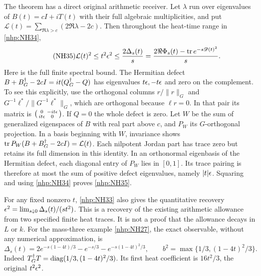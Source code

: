 The theorem has a direct original arithmetic receiver.
Let \(\lambda\) run over eigenvalues of \(B(t)=cI+iT(t)\)
with their full algebraic multiplicities, and put
\(\mathcal L(t)=\sum_{\Re\lambda>c}(2\Re\lambda-2c)\).
Then throughout the heat-time range in \eqref{nhp:NH34},
\begin{equation}\tag{NH35}\label{nhp:NH35}
\mathcal L(t)^2\le t^2\epsilon^2
\le\frac{2\Delta_s(t)}s
=\frac{2\Re\Phi_s(t)-\operatorname{tr} e^{-s\mathscr D(t)^2}}s .
\end{equation}
Here is the full finite spectral bound.
The Hermitian defect
\(B+B^\dagger_G-2cI=it(Q^\dagger_G-Q)\) has eigenvalues
\(t\epsilon,-t\epsilon\) and zero on the complement.
To see this explicitly, use the orthogonal columns
\(r/\|r\|_G\) and
\(G^{-1}\ell^*/\|G^{-1}\ell^*\|_G\), which are orthogonal
because \(\ell r=0\).
In that pair its matrix is
\(\left(\begin{smallmatrix}0&-it\epsilon\\it\epsilon&0\end{smallmatrix}\right)\).
If \(Q=0\) the whole defect is zero.
Let \(W\) be the sum of generalized eigenspaces of \(B\)
with real part above \(c\), and \(P_W\) its
\(G\)-orthogonal projection.
In a basis beginning with \(W\), invariance shows
\(\operatorname{tr} P_W(B+B^\dagger_G-2cI)=\mathcal L(t)\).
Each nilpotent Jordan part has trace zero but retains
its full dimension in this identity.
In an orthonormal eigenbasis of the Hermitian defect,
each diagonal entry of \(P_W\) lies in \([0,1]\).
Its trace pairing is therefore at most the sum of
positive defect eigenvalues, namely \(|t|\epsilon\).
Squaring and using \eqref{nhp:NH34} proves \eqref{nhp:NH35}.

For any fixed nonzero \(t\), \eqref{nhp:NH33} also gives
the quantitative recovery
\(\epsilon^2=\lim_{s\downarrow0}\Delta_s(t)/(st^2)\).
This is a recovery of the existing arithmetic allowance
from two specified finite heat traces. It is not a
proof that the allowance decays in \(L\) or \(k\).
For the mass-three example \eqref{nhp:NH27}, the exact
observable, without any numerical approximation, is
\begin{equation}\tag{NH36}\label{nhp:NH36}
\Delta_s(t)=
2e^{-s(1-4t)/3}-e^{-s/3}
-e^{-s(1-4t)^2/3},\qquad
b^2=\max\{1/3,(1-4t)^2/3\}.
\end{equation}
Indeed \(T^\dagger_G T=\operatorname{diag}(1/3,(1-4t)^2/3)\).
Its first heat coefficient is \(16t^2/3\), the
original \(t^2\epsilon^2\).

